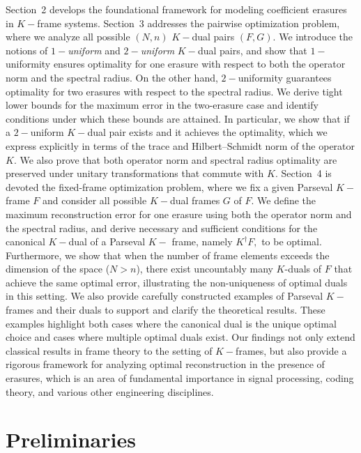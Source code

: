 \documentclass[final,1p,times]{elsarticle}
\begin{document}
Section~2 develops the foundational framework for modeling coefficient erasures in $K-$frame systems. Section~3 addresses the pairwise optimization problem, where we analyze all possible $(N,n)$ $K-$dual pairs $(F, G)$. We introduce the notions of \textit{$1-$uniform} and \textit{$2-$uniform} $K-$dual pairs, and show that $1-$uniformity ensures optimality for one erasure with respect to both the operator norm and the spectral radius. On the other hand, $2-$uniformity guarantees optimality for two erasures with respect to the spectral radius. We derive tight lower bounds for the maximum error in the two-erasure case and identify conditions under which these bounds are attained. In particular, we show that if a $2-$uniform $K-$dual pair exists and it achieves the optimality, which we express explicitly in terms of the trace and Hilbert–Schmidt norm of the operator $K$. We also prove that both operator norm and spectral radius optimality are preserved under unitary transformations that commute with $K$. Section~4 is devoted the fixed-frame optimization problem, where we fix a given Parseval $K-$frame $F$ and consider all possible $K-$dual frames $G$ of $F$. We define the maximum reconstruction error for one erasure using both the operator norm and the spectral radius, and derive necessary and sufficient conditions for the canonical $K-$dual of a Parseval $K-$ frame, namely $K^\dag F,$ to be optimal.  Furthermore, we show that when the number of frame elements exceeds the dimension of the space ($N > n$), there exist uncountably many $K$-duals of $F$ that achieve the same optimal error, illustrating the non-uniqueness of optimal duals in this setting. We also provide carefully constructed examples of Parseval $K-$frames and their duals to support and clarify the theoretical results. These examples highlight both cases where the canonical dual is the unique optimal choice and cases where multiple optimal duals exist. Our findings not only extend classical results in frame theory to the setting of \( K-\)frames, but also provide a rigorous framework for analyzing optimal reconstruction in the presence of erasures, which is an area of fundamental importance in signal processing, coding theory, and various other engineering disciplines.

	
	\section{Preliminaries  }

\end{document}
